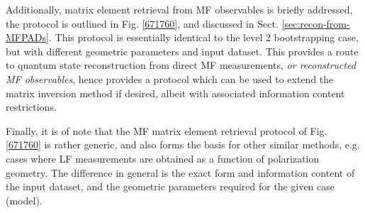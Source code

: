 \documentclass[10pt]{article}
\begin{document}
Additionally, matrix element retrieval from MF observables is briefly addressed, the protocol is outlined in Fig. \ref{671760}, and discussed in Sect. \ref{sec:recon-from-MFPADs}. This protocol is essentially identical to the level 2 bootstrapping case, but with different geometric parameters and input dataset. This provides a route to quantum state reconstruction from direct MF measurements, \textit{or reconstructed MF observables}, hence provides a protocol which can be used to extend the matrix inversion method if desired, albeit with associated information content restrictions.

Finally, it is of note that the MF matrix element retrieval protocol of Fig. \ref{671760} is rather generic, and also forms the basis for other similar methods, e.g. cases where LF measurements are obtained as a function of polarization geometry. The difference in general is the exact form and information content of the input dataset, and the geometric parameters required for the given case (model).

\end{document}
